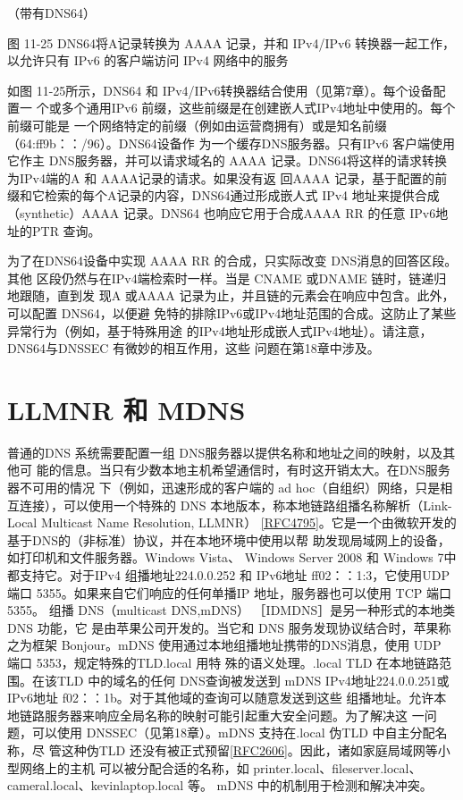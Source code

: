 （带有DNS64）

图 11-25 DNS64将A记录转换为 AAAA 记录，并和 IPv4/IPv6 转换器一起工作，
以允许只有 IPv6 的客户端访问 IPv4 网络中的服务

如图 11-25所示，DNS64 和 IPv4/IPv6转换器结合使用（见第7章）。每个设备配置一
个或多个通用IPv6 前缀，这些前缀是在创建嵌人式IPv4地址中使用的。每个前缀可能是
一个网络特定的前缀（例如由运营商拥有）或是知名前缀（64:ff9b：：/96）。DNS64设备作
为一个缓存DNS服务器。只有IPv6 客户端使用它作主 DNS服务器，并可以请求域名的
AAAA 记录。DNS64将这样的请求转换为IPv4端的A 和 AAAA记录的请求。如果没有返
回AAAA 记录，基于配置的前缀和它检索的每个A记录的内容，DNS64通过形成嵌人式
IPv4 地址来提供合成（synthetic）AAAA 记录。DNS64 也响应它用于合成AAAA RR 的任意
IPv6地址的PTR 查询。

为了在DNS64设备中实现 AAAA RR 的合成，只实际改变 DNS消息的回答区段。其他
区段仍然与在IPv4端检索时一样。当是 CNAME 或DNAME 链时，链递归地跟随，直到发
现A 或AAAA 记录为止，并且链的元素会在响应中包含。此外，可以配置 DNS64，以便避
免特的排除IPv6或IPv4地址范围的合成。这防止了某些异常行为（例如，基于特殊用途
的IPv4地址形成嵌人式IPv4地址）。请注意，DNS64与DNSSEC 有微妙的相互作用，这些
问题在第18章中涉及。

\section{LLMNR 和 MDNS}

普通的DNS 系统需要配置一组 DNS服务器以提供名称和地址之间的映射，以及其他可
能的信息。当只有少数本地主机希望通信时，有时这开销太大。在DNS服务器不可用的情况
下（例如，迅速形成的客户端的 ad hoc（自组织）网络，只是相互连接），可以使用一个特殊的
DNS 本地版本，称本地链路组播名称解析（Link-Local Multicast Name Resolution, LLMNR）
\href{https://www.rfc-editor.org/rfc/rfc4795}{[RFC4795]}。它是一个由微软开发的基于DNS的（非标准）协议，并在本地环境中使用以帮
助发现局域网上的设备，如打印机和文件服务器。Windows Vista、 Windows Server 2008 和
Windows 7中都支持它。对于IPv4 组播地址224.0.0.252 和 IPv6地址 ff02：：1:3，它使用UDP
端口 5355。如果来自它们响应的任何单播IP 地址，服务器也可以使用 TCP 端口 5355。
组播 DNS（multicast DNS,mDNS） ［IDMDNS］是另一种形式的本地类 DNS 功能，它
是由苹果公司开发的。当它和 DNS 服务发现协议结合时，苹果称之为框架 Bonjour。mDNS
使用通过本地组播地址携带的DNS消息，使用 UDP 端口 5353，规定特殊的TLD.local 用特
殊的语义处理。.local TLD 在本地链路范围。在该TLD 中的域名的任何 DNS查询被发送到
mDNS IPv4地址224.0.0.251或IPv6地址 f02：：1b。对于其他域的查询可以随意发送到这些
组播地址。允许本地链路服务器来响应全局名称的映射可能引起重大安全问题。为了解决这
一问题，可以使用 DNSSEC（见第18章）。mDNS 支持在.local 伪TLD 中自主分配名称，尽
管这种伪TLD 还没有被正式预留\href{https://www.rfc-editor.org/rfc/rfc2606}{[RFC2606]}。因此，诸如家庭局域网等小型网络上的主机
可以被分配合适的名称，如 printer.local、fileserver.local、cameral.local、kevinlaptop.local 等。
mDNS 中的机制用于检测和解决冲突。

